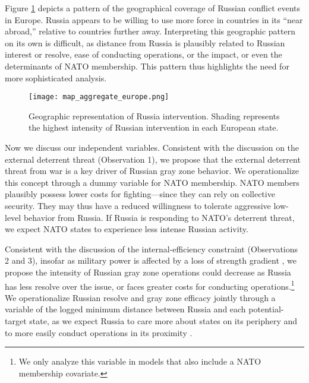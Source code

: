 \documentclass[11pt,letterpaper,pdftex,dvipsnames,table]{article}
\begin{document}
Figure \ref{fig:map} depicts a pattern of the geographical coverage of Russian conflict events in Europe. Russia appears to be willing to use more force in countries in its ``near abroad,'' relative to countries further away. Interpreting this geographic pattern on its own is difficult, as distance from Russia is plausibly related to Russian interest or resolve, ease of conducting operations, or the impact, or even the determinants of NATO membership. This pattern thus highlights the need for more sophisticated analysis.

	\begin{figure}[H]
		\centering
		\texttt{[image: map\_aggregate\_europe.png]}
		\caption{Geographic representation of Russia intervention. Shading represents the highest intensity of Russian intervention in each European state.}
		\label{fig:map}
	\end{figure}

Now we discuss our independent variables. Consistent with the discussion on the external deterrent threat (Observation 1), we propose that the external deterrent threat from war is a key driver of Russian gray zone behavior. We operationalize this concept through a dummy variable for NATO membership. NATO members plausibly possess lower costs for fighting---since they can rely on collective security. They may thus have a reduced willingness to tolerate aggressive low-level behavior from Russia. If Russia is responding to NATO's deterrent threat, we expect NATO states to experience less intense Russian activity. 

Consistent with the discussion of the internal-efficiency constraint (Observations 2 and 3), insofar as military power is affected by a loss of strength gradient \citep{corbett_principlesmaritimestrategy_1911, posen_commandcommonsmilitary_2003}, we propose the intensity of Russian gray zone operations could decrease as Russia has less resolve over the issue, or faces greater costs for conducting operations.\footnote{We only analyze this variable in models that also include a NATO membership covariate.} We operationalize Russian resolve and gray zone efficacy jointly through a variable of the logged minimum distance between Russia and each potential-target state, as we expect Russia to care more about states on its periphery and to more easily conduct operations in its proximity \citep{weidmann_geographyinternationalsystem_2010}.
\end{document}
